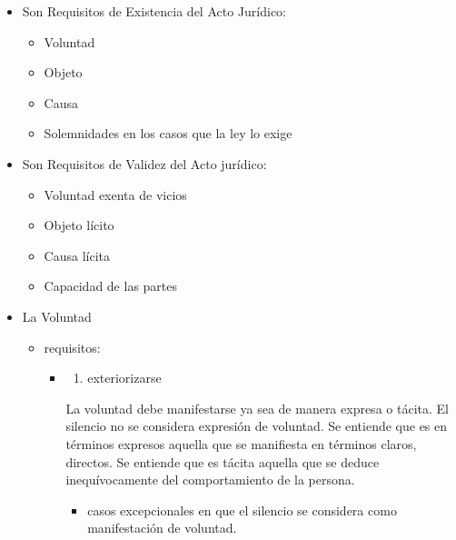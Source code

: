 \documentclass[]{article}
\providecommand{\tightlist}{%
  \setlength{\itemsep}{0pt}\setlength{\parskip}{0pt}}
\begin{document}
\begin{itemize}
\item
  Son Requisitos de Existencia del Acto Jurídico:

  \begin{itemize}
  \tightlist
  \item
    Voluntad
  \item
    Objeto
  \item
    Causa
  \item
    Solemnidades en los casos que la ley lo exige
  \end{itemize}
\item
  Son Requisitos de Validez del Acto jurídico:

  \begin{itemize}
  \tightlist
  \item
    Voluntad exenta de vicios
  \item
    Objeto lícito
  \item
    Causa lícita
  \item
    Capacidad de las partes
  \end{itemize}
\item
  La Voluntad

  \begin{itemize}
  \item
    requisitos:

    \begin{itemize}
    \item
      \begin{enumerate}
      \def\labelenumi{\alph{enumi})}
      \tightlist
      \item
        exteriorizarse
      \end{enumerate}

      La voluntad debe manifestarse ya sea de manera expresa o tácita.
      El silencio no se considera expresión de voluntad. Se entiende que
      es en términos expresos aquella que se manifiesta en términos
      claros, directos. Se entiende que es tácita aquella que se deduce
      inequívocamente del comportamiento de la persona.

      \begin{itemize}
      \tightlist
      \item
        casos excepcionales en que el silencio se considera como
        manifestación de voluntad.


\end{itemize}
\end{itemize}
\end{itemize}
\end{itemize}
\end{document}
